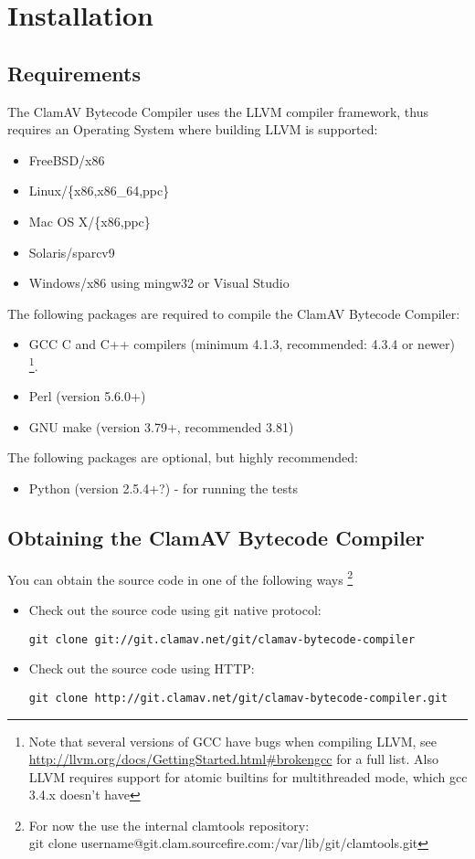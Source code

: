 \chapter{Installation}
\section{Requirements}
The ClamAV Bytecode Compiler uses the LLVM compiler framework, thus requires an Operating System
where building LLVM is supported:
\begin{itemize}
 \item FreeBSD/x86
 \item Linux/\{x86,x86\_64,ppc\}
 \item Mac OS X/\{x86,ppc\}
 \item Solaris/sparcv9
 \item Windows/x86 using mingw32 or Visual Studio
\end{itemize}

The following packages are required to compile the ClamAV Bytecode Compiler:
\begin{itemize}
 \item GCC C and C++ compilers (minimum 4.1.3, recommended: 4.3.4 or newer)
\footnote{Note that several versions of GCC have bugs when compiling LLVM, see \url{http://llvm.org/docs/GettingStarted.html\#brokengcc} for a full list.
Also LLVM requires support for atomic builtins for multithreaded mode, which gcc 3.4.x doesn't have}.
 \item Perl (version 5.6.0+)
 \item GNU make (version 3.79+, recommended 3.81)
\end{itemize}

The following packages are optional, but highly recommended:
\begin{itemize}
 \item Python (version 2.5.4+?) - for running the tests
\end{itemize}

\section{Obtaining the ClamAV Bytecode Compiler}
You can obtain the source code in one of the following ways \footnote{For now the use the internal clamtools repository:\\
git clone username@git.clam.sourcefire.com:/var/lib/git/clamtools.git}
\begin{itemize}
 \item Check out the source code using git native protocol:

 \verb+git clone git://git.clamav.net/git/clamav-bytecode-compiler+
 \item Check out the source code using HTTP:

 \verb+git clone http://git.clamav.net/git/clamav-bytecode-compiler.git+
\end{itemize}


